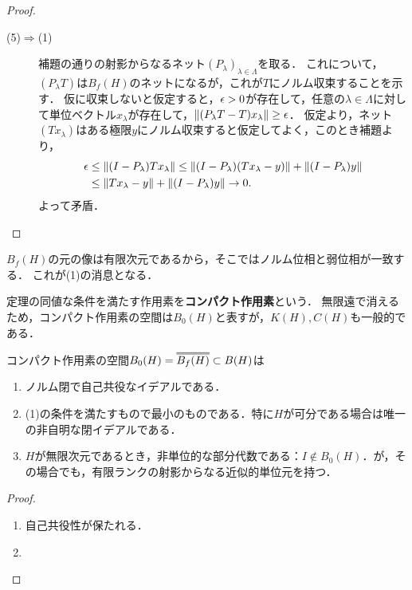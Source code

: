 \documentclass[uplatex,dvipdfmx]{jsreport}
\begin{document}
\begin{proof}
\begin{description}
        \item[(5)$\Rightarrow$(1)]
        補題の通りの射影からなるネット$(P_\lambda)_{\lambda\in\Lambda}$を取る．
        これについて，$(P_\lambda T)$は$B_f(H)$のネットになるが，これが$T$にノルム収束することを示す．
        仮に収束しないと仮定すると，$\epsilon>0$が存在して，任意の$\lambda\in\Lambda$に対して単位ベクトル$x_\lambda$が存在して，$\|(P_\lambda T-T)x_\lambda\|\ge\epsilon$．
        仮定より，ネット$(Tx_\lambda)$はある極限$y$にノルム収束すると仮定してよく，このとき補題より，
        \begin{align*}
            \epsilon&\le\|(I-P_\lambda)Tx_\lambda\|\le\|(I-P_\lambda)(Tx_\lambda-y)\|+\|(I-P_\lambda)y\|\\
            &\le\|Tx_\lambda-y\|+\|(I-P_\lambda)y\|\to0.
        \end{align*}
        よって矛盾．
    \end{description}
\end{proof}
\begin{remarks}
    $B_f(H)$の元の像は有限次元であるから，そこではノルム位相と弱位相が一致する．
    これが(1)の消息となる．
\end{remarks}

\begin{definition}
    定理の同値な条件を満たす作用素を\textbf{コンパクト作用素}という．
    無限遠で消えるため，コンパクト作用素の空間は$B_0(H)$と表すが，$K(H),C(H)$も一般的である．
\end{definition}

\begin{lemma}[コンパクト作用素の空間の描像]
    コンパクト作用素の空間$B_0(H)=\oo{B_f(H)}\subset B(H)$は
    \begin{enumerate}
        \item ノルム閉で自己共役なイデアルである．
        \item (1)の条件を満たすもので最小のものである．特に$H$が可分である場合は唯一の非自明な閉イデアルである．
        \item $H$が無限次元であるとき，非単位的な部分代数である：$I\notin B_0(H)$．が，その場合でも，有限ランクの射影からなる近似的単位元を持つ．
    \end{enumerate}
\end{lemma}
\begin{proof}\mbox{}
    \begin{enumerate}
        \item 自己共役性が保たれる．
        \item 
    \end{enumerate}
\end{proof}
\end{document}
